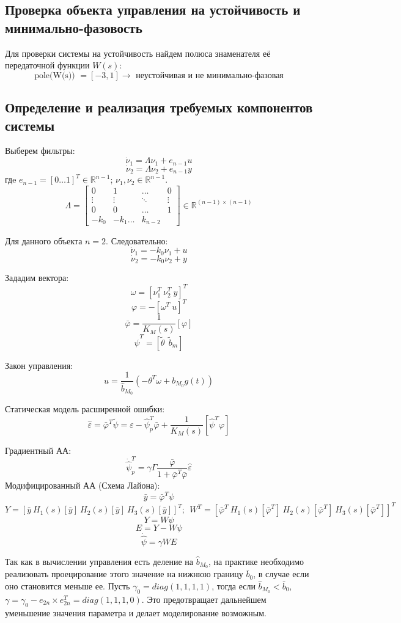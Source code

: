 \documentclass{article}
\begin{document}
\subsection{Проверка объекта управления на устойчивость и минимально-фазовость}
Для проверки системы на устойчивость найдем полюса знаменателя её передаточной функции \(W(s)\):
\[\text{pole(W(s)) } = [-3, 1] \rightarrow \text{ неустойчивая и не минимально-фазовая}\]

\subsection{Определение и реализация требуемых компонентов системы}
Выберем фильтры:
\[\dot \nu_1 = \Lambda \nu_1 + e_{n-1}u\]
\[\dot \nu_2 = \Lambda \nu_2 + e_{n-1}y\]
гдe \(e_{n-1} = [0 \hdots 1]^T \in \mathds{R}^{n-1}\); \(\nu_1, \nu_2 \in \mathds{R}^{n-1}\).
\[\Lambda = \begin{bmatrix}
  0 & 1 & \hdots & 0 \\
  \vdots & \vdots & \ddots & \vdots \\
  0 & 0 & \hdots & 1 \\
  -k_0 & -k_1 \hdots & k_{n- 2}
\end{bmatrix} \in \mathds{R}^{(n-1) \times (n-1)} \]

Для данного объекта \(n=2\). Следовательно:
\[\dot \nu_1 = -k_0 \nu_1 + u\]
\[\dot \nu_2 = -k_0 \nu_2 + y\]

Зададим вектора:
\[\omega = [\nu_1^T~\nu_2^T~y]^T\]
\[\varphi= -[\omega^T~u]^T\]
\[\bar \varphi= \frac{1}{K_M(s)}[\varphi]\]
\[\hat{\psi}^T = [\tilde \theta ~~ \tilde b_m] \]

Закон управления:
\[u = \frac{1}{\hat b_{M_0}}(-\theta^T \omega + b_{M_0} g(t)) \]

Статическая модель расширенной ошибки:
\[\hat \varepsilon = \bar \varphi^T \tilde \psi =  \varepsilon - \hat{\psi}_p^T \bar \varphi + \frac{1}{K_M(s)}[ \hat{\psi}^T \varphi]\]

Градиентный АА:
\[\dot {\hat{\psi}}_p^T = \gamma \Gamma \frac{\bar \varphi}{1 + \bar \varphi^T \bar \varphi} \hat \varepsilon\]
Модифицированный АА (Схема Лайона):
\[\bar y = \bar \varphi^T \psi\]
\[Y = [\bar y~H_1(s)[\bar y]~H_2(s)[\bar y]~H_3(s)[\bar y]]^T;~~W^T = [\bar \varphi^T~H_1(s)[\bar \varphi^T]~H_2(s)[\bar \varphi^T]~H_3(s)[\bar \varphi^T]]^T\]
\[Y = W \psi\]
\[E = Y - W \psi\]
\[\dot {\hat{\psi}} = \gamma W E\]

Так как в вычислении управления есть деление на \(\hat b_{M_0}\), на практике необходимо реализовать проецирование этого значение на нижнюю границу \(\bar b_0\), в случае если оно становится меньше ее. 
Пусть \(\gamma_0 = diag(1, 1, 1, 1)\), тогда если \(\hat b_{M_0} < \bar b_0\), \(\gamma = \gamma_0 - e_{2n} \times e_{2n}^T = diag(1, 1, 1, 0)\). Это предотвращает дальнейшем уменьшение значения параметра и делает моделирование возможным.
\end{document}
